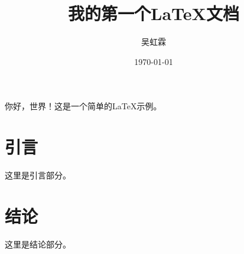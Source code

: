 \documentclass{article}
\title{我的第一个LaTeX文档}
\author{吴虹霖}
\date{\today}
\begin{document}
\maketitle

你好，世界！这是一个简单的LaTeX示例。

\section{引言}
这里是引言部分。

\section{结论}
这里是结论部分。
\end{document}
